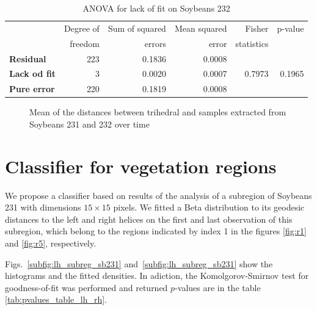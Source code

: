 \documentclass[12pt]{article}
\begin{document}
\begin{table}[hbt]
  \centering
  \caption{ANOVA for lack of fit on Soybeans 232}
  \label{tab:anova_sb232}
  \begin{tabular}{lrrrrr}
    \toprule
    & Degree of & Sum of squared & Mean squared & Fisher & p-value\\
    & freedom & errors & error & statistics &\\
    \cmidrule(lr){2-6}
    \textbf{Residual} & 223 & 0.1836 & 0.0008 & &\\
    \textbf{Lack od fit} & 3 & 0.0020 & 0.0007 & 0.7973 & 0.1965\\
    \textbf{Pure error} & 220 & 0.1819 & 0.0008 & &\\
    \bottomrule
  \end{tabular}
\end{table}

\begin{figure}[hbt]
  \caption{Mean of the distances between trihedral and samples extracted from Soybeans 231 and 232 over time}
  \label{fig:tri_mean_sb_231_232}
\end{figure}

\section{Classifier for vegetation regions}

We propose a classifier based on results of the analysis of a subregion of Soybeans 231 with dimensions $15\times 15$ pixels.
We fitted a Beta distribution to its geodesic distances to the left and right helices on the first and last observation of this subregion, which belong to the regions indicated by index 1 in the figures \ref{fig:r1} and \ref{fig:r5}, respectively.

Figs.~\ref{subfig:lh_subreg_sb231} and~\ref{subfig:lh_subreg_sb231} show the histograms and the fitted densities.
In adiction, the Komolgorov-Smirnov test for goodness-of-fit was performed and returned $p$-values are in the table \ref{tab:pvalues_table_lh_rh}.
\end{document}
